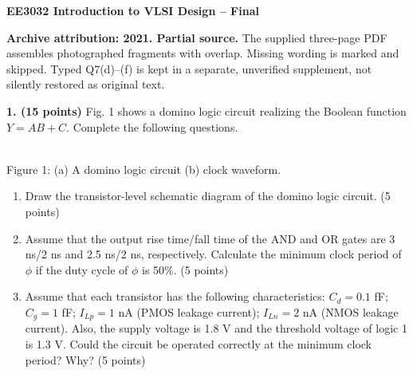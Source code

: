 \documentclass[10pt]{article}
\begin{document}
\begin{center}{\large\bfseries EE3032 Introduction to VLSI Design -- Final}\end{center}
\textbf{Archive attribution: 2021. Partial source.} The supplied three-page PDF assembles photographed fragments with overlap. Missing wording is marked and skipped. Typed Q7(d)--(f) is kept in a separate, unverified supplement, not silently restored as original text.

\textbf{1. (15 points)} Fig. 1 shows a domino logic circuit realizing the Boolean function $Y=AB+C$. Complete the following questions.
\begin{center}\\Figure 1: (a) A domino logic circuit (b) clock waveform.\end{center}
\begin{enumerate}[label=(\alph*),leftmargin=7mm]
\item Draw the transistor-level schematic diagram of the domino logic circuit. (5 points)
\item Assume that the output rise time/fall time of the AND and OR gates are 3 ns/2 ns and 2.5 ns/2 ns, respectively. Calculate the minimum clock period of $\phi$ if the duty cycle of $\phi$ is 50\%. (5 points)
\item Assume that each transistor has the following characteristics: $C_d=0.1$ fF; $C_g=1$ fF; $I_{Lp}=1$ nA (PMOS leakage current); $I_{Ln}=2$ nA (NMOS leakage current). Also, the supply voltage is 1.8 V and the threshold voltage of logic 1 is 1.3 V. Could the circuit be operated correctly at the minimum clock period? Why? (5 points)
\end{enumerate}
\end{document}
